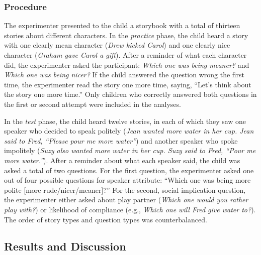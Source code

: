 \documentclass[10pt, letterpaper]{article}
\begin{document}
\subsubsection{Procedure}\label{procedure}

The experimenter presented to the child a storybook with a total of
thirteen stories about different characters. In the \emph{practice}
phase, the child heard a story with one clearly mean character
(\emph{Drew kicked Carol}) and one clearly nice character (\emph{Graham
gave Carol a gift}). After a reminder of what each character did, the
experimenter asked the participant: \emph{Which one was being meaner?}
and \emph{Which one was being nicer?} If the child answered the question
wrong the first time, the experimenter read the story one more time,
saying, ``Let's think about the story one more time.'' Only children who
correctly answered both questions in the first or second attempt were
included in the analyses.

In the \emph{test} phase, the child heard twelve stories, in each of
which they saw one speaker who decided to speak politely (\emph{Jean
wanted more water in her cup. Jean said to Fred, ``Please pour me more
water''}) and another speaker who spoke impolitely (\emph{Suzy also
wanted more water in her cup. Suzy said to Fred, ``Pour me more
water.''}). After a reminder about what each speaker said, the child was
asked a total of two questions. For the first question, the experimenter
asked one out of four possible questions for speaker attribute: ``Which
one was being more polite {[}more rude/nicer/meaner{]}?'' For the
second, social implication question, the experimenter either asked about
play partner (\emph{Which one would you rather play with?}) or
likelihood of compliance (e.g., \emph{Which one will Fred give water
to?}). The order of story types and question types was counterbalanced.

\subsection{Results and Discussion}\label{results-and-discussion}
\end{document}
